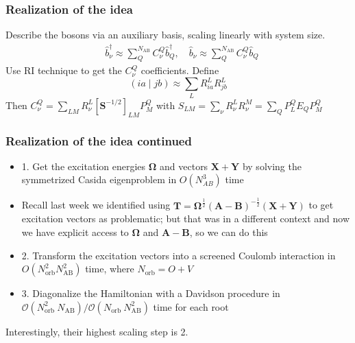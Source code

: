 \documentclass{beamer}
\begin{document}
\begin{frame}
    \frametitle{Realization of the idea}
Describe the bosons via an auxiliary basis, scaling linearly with system size.
\begin{equation}
\begin{aligned}
& \hat{b}_\nu^{\dagger} \approx \sum_Q^{N_{\mathrm{AB}}} C_\nu^Q \hat{b}_Q^{\dagger}, \quad \hat{b}_\nu \approx \sum_Q^{N_{\mathrm{AB}}} C_\nu^Q \hat{b}_Q
\end{aligned}
\end{equation}
Use RI technique to get the $C_\nu^Q$ coefficients. Define 
\begin{equation}
(i a \mid j b) \approx \sum_L R_{i a}^L R_{j b}^L
\end{equation}
Then 
$C_\nu^Q=\sum_{L M} R_\nu^L\left[\mathbf{S}^{-1 / 2}\right]_{L M} P_M^Q$ with $S_{L M}=\sum_\nu R_\nu^L R_\nu^M=\sum_Q P_L^Q E_Q P_M^Q$

\end{frame}

\begin{frame}
    \frametitle{Realization of the idea continued}
\begin{itemize}
    \item 1. Get the excitation energies $\bm{\Omega}$ and vectors $\bm{X}+\bm{Y}$ by solving the symmetrized Casida eigenproblem in $O(N_{AB}^3)$ time 
    \item Recall last week we identified using $\textbf{T} = \boldsymbol{\Omega }^{\frac{1}{2}} \left(\textbf{A}-\textbf{B}\right)^{-\frac{1}{2}}\left(\textbf{X} + \textbf{Y}\right)$ to get excitation vectors as problematic; but that was in a different context and now we have explicit access to $\bm{\Omega }$ and $\bm{A}-\bm{B}$, so we can do this
    \item 2. Transform the excitation vectors into a screened Coulomb interaction in $O(N_{\text{orb}}^2 N_{\text{AB}}^2)$ time, where $N_{\text{orb}}=O+V$
    \item 3. Diagonalize the Hamiltonian with a Davidson procedure in $\mathcal{O}\left(N_{\text {orb }}^2 N_{\mathrm{AB}}\right) / \mathcal{O}\left(N_{\text {orb }} N_{\mathrm{AB}}^2\right)$ time for each root
\end{itemize}
Interestingly, their highest scaling step is 2. 
\end{frame}
\end{document}
